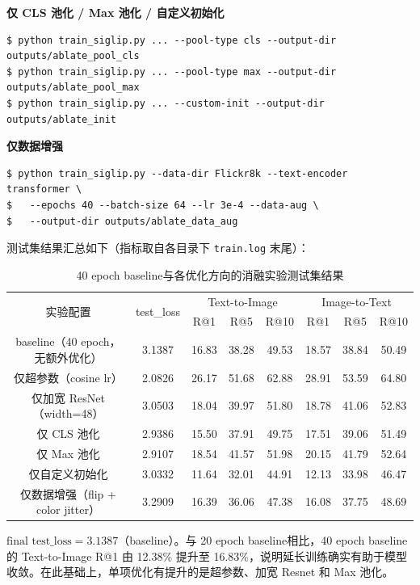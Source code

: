 \documentclass[a4paper]{article}
\begin{document}
\textbf{仅 CLS 池化 / Max 池化 / 自定义初始化}

\begin{lstlisting}
$ python train_siglip.py ... --pool-type cls --output-dir outputs/ablate_pool_cls
$ python train_siglip.py ... --pool-type max --output-dir outputs/ablate_pool_max
$ python train_siglip.py ... --custom-init --output-dir outputs/ablate_init
\end{lstlisting}

\textbf{仅数据增强}

\begin{lstlisting}
$ python train_siglip.py --data-dir Flickr8k --text-encoder transformer \
$   --epochs 40 --batch-size 64 --lr 3e-4 --data-aug \
$   --output-dir outputs/ablate_data_aug
\end{lstlisting}

测试集结果汇总如下（指标取自各目录下 \texttt{train.log} 末尾）：

\begin{table}[H]
    \centering
    \begin{tabular}{c|c|ccc|ccc}
        \hline
        \multirow{2}{*}{实验配置} & \multirow{2}{*}{test\_loss} & \multicolumn{3}{c|}{Text-to-Image} & \multicolumn{3}{c}{Image-to-Text} \\
        & & R@1 & R@5 & R@10 & R@1 & R@5 & R@10 \\
        \hline
        baseline（40 epoch，无额外优化） & 3.1387 & 16.83 & 38.28 & 49.53 & 18.57 & 38.84 & 50.49 \\
        仅超参数（cosine lr） & 2.0826 & 26.17 & 51.68 & 62.88 & 28.91 & 53.59 & 64.80 \\
        仅加宽 ResNet（width=48） & 3.0503 & 18.04 & 39.97 & 51.80 & 18.78 & 41.06 & 52.83 \\
        仅 CLS 池化 & 2.9386 & 15.50 & 37.91 & 49.75 & 17.51 & 39.06 & 51.49 \\
        仅 Max 池化 & 2.9107 & 18.54 & 41.57 & 51.98 & 20.15 & 41.79 & 52.64 \\
        仅自定义初始化 & 3.0332 & 11.64 & 32.01 & 44.91 & 12.13 & 33.98 & 46.47 \\
        仅数据增强（flip + color jitter） & 3.2909 & 16.39 & 36.06 & 47.38 & 16.08 & 37.75 & 48.69 \\
        \hline
    \end{tabular}
    \caption{40 epoch baseline与各优化方向的消融实验测试集结果}
    \label{tab:ablation}
\end{table}

$\text{final test\_loss}=3.1387$（baseline）。与 20 epoch baseline相比，40 epoch baseline的 Text-to-Image R@1 由 12.38\% 提升至 16.83\%，说明延长训练确实有助于模型收敛。在此基础上，单项优化有提升的是超参数、加宽 Resnet 和 Max 池化。
\end{document}
